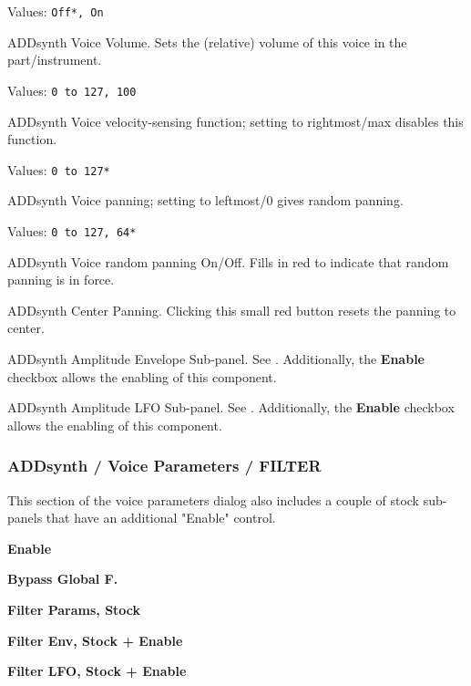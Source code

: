    Values: \texttt{Off*, On}

   ADDsynth Voice Volume.
   Sets the (relative) volume of this voice in the part/instrument.

   Values: \texttt{0 to 127, 100}

   ADDsynth Voice velocity-sensing function; setting to rightmost/max
   disables this function.

   Values: \texttt{0 to 127*}

   ADDsynth Voice panning; setting to leftmost/0 gives random panning.

   Values: \texttt{0 to 127, 64*}

   ADDsynth Voice random panning On/Off.
   Fills in red to indicate that random panning is in force.

   ADDsynth Center Panning.
   Clicking this small red button resets the panning to center.

   ADDsynth Amplitude Envelope Sub-panel.
   See .
   Additionally, the \textbf{Enable} checkbox allows the enabling of this
   component.

   ADDsynth Amplitude LFO Sub-panel.
   See .
   Additionally, the \textbf{Enable} checkbox allows the enabling of this
   component.

\subsubsection{ADDsynth / Voice Parameters / FILTER}
\label{subsubsec:addsynth_voice_parameters_filter}

   This section of the voice parameters dialog also includes a couple of
   stock sub-panels that have an additional "Enable" control.

   \begin{enumber}
      \item \textbf{Enable}
      \item \textbf{Bypass Global F.}
      \item \textbf{Filter Params, Stock}
      \item \textbf{Filter Env, Stock + Enable}
      \item \textbf{Filter LFO, Stock + Enable}
   \end{enumber}

